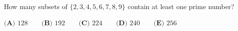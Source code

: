 How many subsets of $\{2,3,4,5,6,7,8,9\}$ contain at least one prime number?

$\textbf{(A) } 128\qquad\textbf{(B) } 192\qquad\textbf{(C) } 224\qquad\textbf{(D) } 240\qquad\textbf{(E) } 256$
